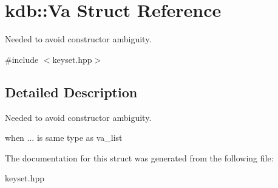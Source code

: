\hypertarget{structkdb_1_1Va}{\section{kdb\-:\-:Va Struct Reference}
\label{structkdb_1_1Va}
}


Needed to avoid constructor ambiguity.  




{\ttfamily \#include $<$keyset.\-hpp$>$}



\subsection{Detailed Description}
Needed to avoid constructor ambiguity. 

when ... is same type as va\-\_\-list 

The documentation for this struct was generated from the following file\-:\begin{DoxyCompactItemize}
\item 
keyset.\-hpp\end{DoxyCompactItemize}
